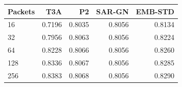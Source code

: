 \begin{tabular}{lrrrr}
\toprule
Packets & T3A & P2 & SAR-GN & EMB-STD \\
\midrule
16 & 0.7196 & 0.8035 & 0.8056 & 0.8134 \\
32 & 0.7956 & 0.8063 & 0.8056 & 0.8224 \\
64 & 0.8228 & 0.8066 & 0.8056 & 0.8260 \\
128 & 0.8336 & 0.8067 & 0.8056 & 0.8285 \\
256 & 0.8383 & 0.8068 & 0.8056 & 0.8290 \\
\bottomrule\end{tabular}
